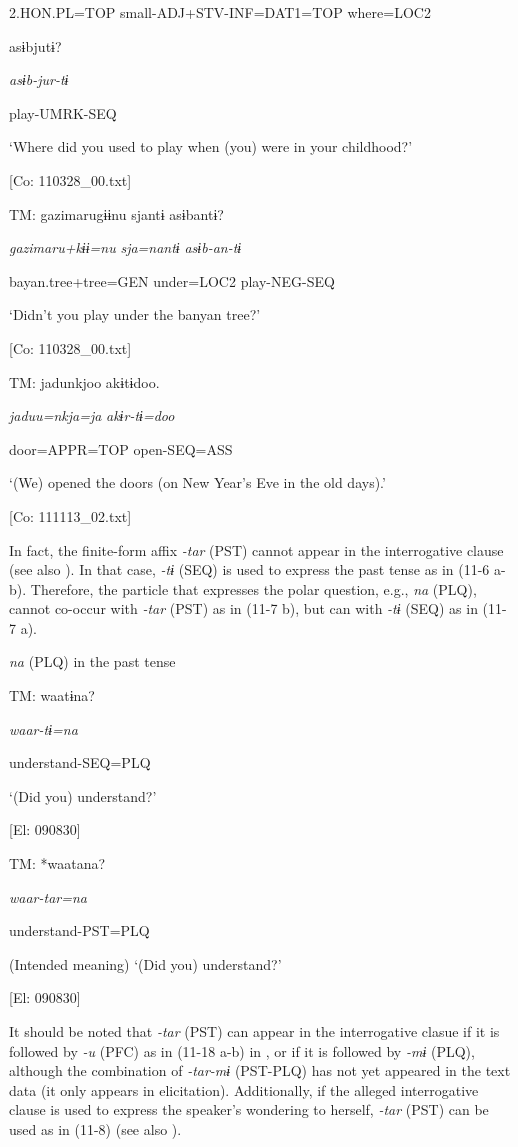       2.HON.PL=TOP  small-ADJ+STV-INF=DAT1=TOP  where=LOC2

      asɨbjutɨ?    

      \textit{asɨb-jur-tɨ}    

      play-UMRK-SEQ    

      ‘Where did you used to play when (you) were in your childhood?’

      [Co: 110328\_00.txt]

  \ex  TM:  gazimarugɨɨnu  sjantɨ  asɨbantɨ?

      \textit{gazimaru+kɨɨ=nu}  \textit{sja=nantɨ}  \textit{asɨb-an-tɨ}

      bayan.tree+tree=GEN  under=LOC2  play-NEG-SEQ

      ‘Didn’t you play under the banyan tree?’

      [Co: 110328\_00.txt]

  \ex  TM:  jadunkjoo  akɨtɨdoo.

      \textit{jaduu=nkja=ja}  \textit{akɨr-tɨ=doo}

      door=APPR=TOP  open-SEQ=ASS

      ‘(We) opened the doors (on New Year’s Eve in the old days).’

      [Co: 111113\_02.txt]
\z
\z

  In fact, the finite-form affix \textit{{}-tar} (PST) cannot appear in the interrogative clause (see also ). In that case, \textit{{}-tɨ} (SEQ) is used to express the past tense as in (11-6 a-b). Therefore, the particle that expresses the polar question, e.g., \textit{na} (PLQ), cannot co-occur with \textit{{}-tar} (PST) as in (11-7 b), but can with \textit{{}-tɨ} (SEQ) as in (11-7 a).

\ea\label{ex:11-7}  \textit{na} (PLQ) in the past tense

  \ea  TM:  waatɨna?

      \textit{waar-tɨ=na}

      understand-SEQ=PLQ

      ‘(Did you) understand?’

      [El: 090830]

  \ex  TM:  *waatana?

       \textit{waar-tar=na}

      understand-PST=PLQ

      (Intended meaning) ‘(Did you) understand?’

      [El: 090830]
\z
\z

  It should be noted that \textit{{}-tar} (PST) can appear in the interrogative clasue if it is followed by \textit{{}-u} (PFC) as in (11-18 a-b) in , or if it is followed by \textit{{}-mɨ} (PLQ), although the combination of \textit{{}-tar-mɨ} (PST-PLQ) has not yet appeared in the text data (it only appears in elicitation). Additionally, if the alleged interrogative clause is used to express the speaker’s wondering to herself, \textit{{}-tar} (PST) can be used as in (11-8) (see also ).


